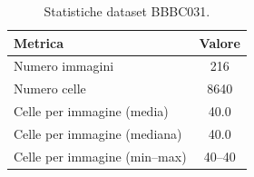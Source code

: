 \begin{table}[ht]
\centering
\caption{Statistiche dataset BBBC031.}
\label{tab:bbbc031_stats}
\begin{tabular}{lc}
\toprule
Metrica & Valore \\
\midrule
Numero immagini & 216 \\
Numero celle & 8640 \\
Celle per immagine (media) & 40.0 \\
Celle per immagine (mediana) & 40.0 \\
Celle per immagine (min--max) & 40--40 \\
\bottomrule
\end{tabular}
\end{table}
